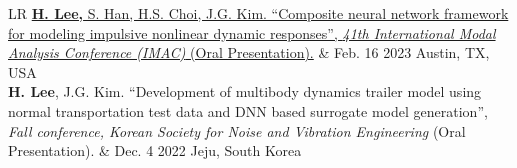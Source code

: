 \documentclass[a4paper,10pt]{extarticle}
\begin{document}
\begin{longtable}{LR}
	\href{https://link.springer.com/chapter/10.1007/978-3-031-34946-1_21}{\textbf{H. Lee,} S. Han, H.S. Choi, J.G. Kim. “Composite neural network framework for modeling impulsive nonlinear dynamic responses”, \textit{41th International Modal Analysis Conference (IMAC)} (Oral Presentation).}                                                                                                                                              & {Feb. 16 2023 \linebreak  Austin, TX, USA}    \\
	\textbf{H. Lee}, J.G. Kim. “Development of multibody dynamics trailer model using normal transportation test data and DNN based surrogate model generation”, \textit{Fall conference, Korean Society for Noise and Vibration Engineering} (Oral Presentation).                                                                                                                                                                               & {Dec. 4 2022 \linebreak Jeju, South Korea}    \\
\end{longtable}


\setlength{\itemsep}{10pt} %
\end{document}
